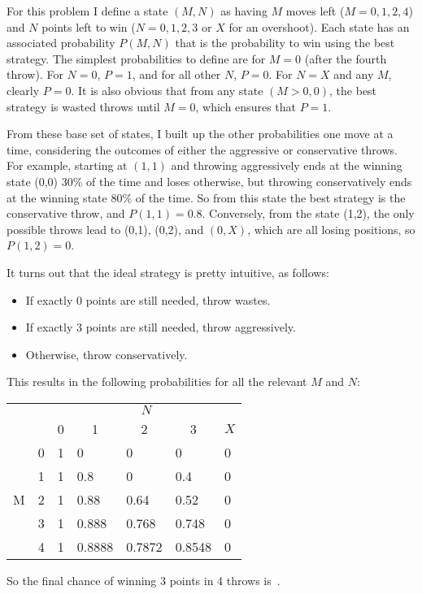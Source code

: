 \documentclass{article}
\begin{document}
For this problem I define a state $(M,N)$ as having $M$ moves left ($M=0,1,2,4$) and $N$ points left to win ($N=0,1,2,3$ or $X$ for an overshoot).
Each state has an associated probability $P(M,N)$ that is the probability to win using the best strategy.
The simplest probabilities to define are for $M=0$ (after the fourth throw).
For $N=0$, $P=1$, and for all other $N$, $P=0$.
For $N=X$ and any $M$, clearly $P=0$.
It is also obvious that from any state $(M>0,0)$, the best strategy is wasted throws until $M=0$, which ensures that $P=1$.

From these base set of states, I built up the other probabilities one move at a time, considering the outcomes of either the aggressive or conservative throws.
For example, starting at $(1,1)$ and throwing aggressively ends at the winning state (0,0) 30\% of the time and loses otherwise, but throwing conservatively ends at the winning state 80\% of the time.
So from this state the best strategy is the conservative throw, and $P(1,1)=0.8$.
Conversely, from the state (1,2), the only possible throws lead to (0,1), (0,2), and $(0,X)$, which are all losing positions, so $P(1,2)=0$.

It turns out that the ideal strategy is pretty intuitive, as follows:

\begin{itemize}
\item If exactly 0 points are still needed, throw wastes.
\item If exactly 3 points are still needed, throw aggressively.
\item Otherwise, throw conservatively.
\end{itemize}

This results in the following probabilities for all the relevant $M$ and $N$:

\vspace{0.1in}
\begin{center}
\begin{tabular}{C{0.2in}C{0.2in}|C{0.32in}|C{0.32in}|C{0.32in}|C{0.32in}|C{0.32in}|}
 &  &  \\
 &  &  &  &  &  &  \\
 & 0 & 1 & 0 & 0 & 0 & 0 \\
 & 1 & 1 & 0.8 & 0 & 0.4 & 0 \\
M & 2 & 1 & 0.88 & 0.64 & 0.52 & 0 \\
 & 3 & 1 & 0.888 & 0.768 & 0.748 & 0 \\
 & 4 & 1 & 0.8888 & 0.7872 & 0.8548 & 0 \\ 
\end{tabular}
\end{center}

So the final chance of winning 3 points in 4 throws is
\,.
\end{document}
